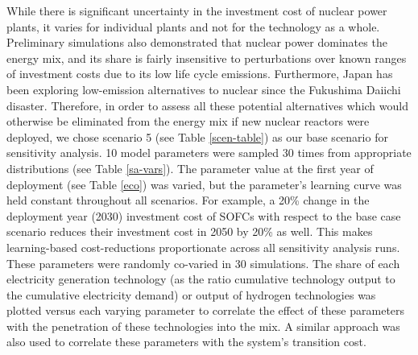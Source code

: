 While there is significant uncertainty in the investment cost of nuclear power plants, it varies for individual plants and not for the technology as a whole. Preliminary simulations also demonstrated that nuclear power dominates the energy mix, and its share is fairly insensitive to perturbations over known ranges of investment costs \cite{lovering_historical_2016} due to its low life cycle emissions. Furthermore, Japan has been exploring low-emission alternatives to nuclear since the Fukushima Daiichi disaster. Therefore, in order to assess all these potential alternatives which would otherwise be eliminated from the energy mix if new nuclear reactors were deployed, we chose scenario 5 (see Table \ref{scen-table}) as our base scenario for sensitivity analysis. 10 model parameters were sampled 30 times from appropriate distributions (see Table \ref{sa-vars}). The parameter value at the first year of deployment (see Table \ref{eco}) was varied, but the parameter's learning curve was held constant throughout all scenarios. For example, a 20\% change in the deployment year (2030) investment cost of \gls{SOFC}s with respect to the base case scenario reduces their investment cost in 2050 by 20\% as well. This makes learning-based cost-reductions proportionate across all sensitivity analysis runs. These parameters were randomly co-varied in 30 simulations. The share of each electricity generation technology (as the ratio cumulative technology output to the cumulative electricity demand) or output of hydrogen technologies was plotted versus each varying parameter to correlate the effect of these parameters with the penetration of these technologies into the mix. A similar approach was also used to correlate these parameters with the system's transition cost.

